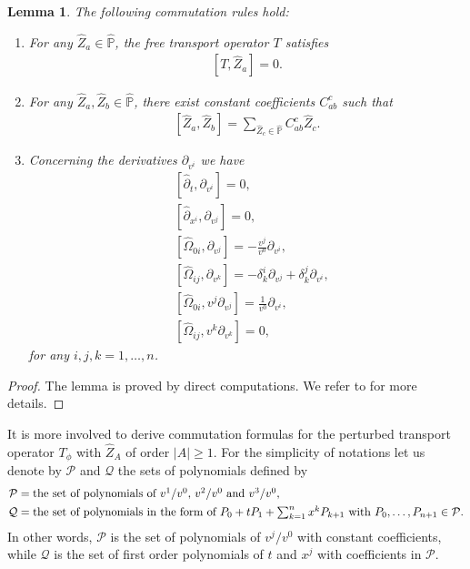 \documentclass{article}
\newtheorem{lemma}{Lemma}[section]
\newcommand{\bbp}{{\mathbb P}}
\newcommand{\cP}{{\mathcal P}}
\newcommand{\cQ}{{\mathcal Q}}
\begin{document}
%
\begin{lemma} \label{lem basic}
The following commutation rules hold:
\begin{enumerate}
\item For any $ \hat{ Z }_a \in \hat{ \bbp } $, the free transport operator $ T $ satisfies
\begin{align*}
\left[ T , \hat{ Z }_a \right] = 0 .
\end{align*}
\item For any $ \hat{ Z }_a , \hat{ Z }_b \in \hat{ \bbp } $, there exist constant coefficients $ C_{ a b }^c $ such that
\begin{align*}
\left[ \hat{ Z }_a , \hat{ Z }_b \right] = \sum_{ \hat{ Z }_c \in \hat{ \bbp } } C_{ a b }^c \hat{ Z }_c .
\end{align*}
\item Concerning the derivatives $ \partial_{ v^i } $ we have
\begin{align*}
& \left[ \hat{ \partial }_t , \partial_{ v^i } \right] = 0 , \\
& \left[ \hat{ \partial }_{ x^i } , \partial_{ v^j } \right] = 0 ,\\
& \left[ \hat{ \Omega }_{ 0 i } , \partial_{ v^j } \right] = - \frac{ v^j }{ v^0 } \partial_{ v^i } , \\
& \left[ \hat{ \Omega }_{ i j } , \partial_{ v^k } \right] = - \delta^i_k \partial_{ v^j } + \delta^j_k \partial_{ v^i } , \\
& \left[ \hat{ \Omega }_{ 0 i } , v^j \partial_{ v^j } \right] = \frac{ 1 }{ v^0 } \partial_{ v^i } , \\
& \left[ \hat{ \Omega }_{ i j } , v^k \partial_{ v^k } \right] = 0 ,
\end{align*}
for any $ i , j , k = 1 , \dots , n $.
\end{enumerate}
\end{lemma}
\begin{proof}
The lemma is proved by direct computations. We refer to \cite{FJS17, S16} for more details.
\end{proof}



It is more involved to derive commutation formulas for the perturbed transport operator $ T_\phi $ with $ \hat{ Z }_A $ of order $ | A | \geq 1 $. For the simplicity of notations let us denote by $ \cP $ and $ \cQ $ the sets of polynomials defined by
\begin{align*}
\cP & = \mbox{the set of polynomials of $ v^1 / v^0 $, $ v^2 / v^0 $ and $ v^3 / v^0 $,} \\
\cQ & = \mbox{the set of polynomials in the form of $ P_0 + t P_1 + \sum_{ k = 1 }^n x^k P_{ k + 1 } $ with $ P_0 , \dots , P_{ n + 1 } \in \cP $.}
\end{align*}
In other words, $ \cP $ is the set of polynomials of $ v^j / v^0 $ with constant coefficients, while $ \cQ $ is the set of first order polynomials of $ t $ and $ x^j $ with coefficients in $ \cP $.
\end{document}
